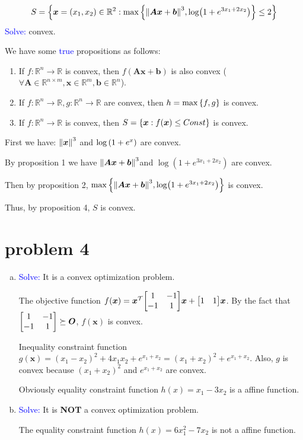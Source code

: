 \documentclass{article}
\def\RR{\mathbb{R}}
\def\bx{\boldsymbol{x}}
\def\bb{\boldsymbol{b}}
\def\bA{\boldsymbol{A}}
\def\bO{\boldsymbol{O}}
\def\Esolve{\textcolor{blue}{Solve: }}
\begin{document}
$$
S=\qty{
	\bx=(x_1,x_2)\in\RR^2:
	\max\qty{\norm{\bA\bx+\bb}^3,\log(1+e^{3x_1+2x_2})}\le2
}
$$
\Esolve convex.

We have some \textcolor{blue}{true} propositions as follows:
\begin{enumerate}[1.]
	\item If $f:\RR^n\to\RR$ is convex, then $f(\bA\bx+\bb)$ is also convex ($\forall\bA\in\RR^{n\times m},\bx\in\RR^m,\bb\in\RR^n$).
	\item If $f:\RR^n\to\RR,g:\RR^n\to\RR$ are convex, then $h=\max\qty{f,g}$ is convex.
	\item If $f:\RR^n\to\RR$ is convex, then $S=\qty{\bx:f(\bx)\le Const}$ is convex.
\end{enumerate}

First we have: $\norm{\bx}^3$ and 
$\log\qty(1+e^x)$ are convex.

By proposition 1 we have 
$\norm{\bA\bx+\bb}^3$and $\log(1+e^{3x_1+2x_2})$ are convex.

Then by proposition 2, $\max\qty{\norm{\bA\bx+\bb}^3,\log(1+e^{3x_1+2x_2})}$ is convex.

Thus, by proposition 4, $S$ is convex.
\section*{problem 4}

\begin{enumerate}[(a)]
	\item 
		\Esolve
		It is a convex optimization problem.

		The objective function 
		$f(\bx)= 
		\bx^\mathcal{T}
		\mqty[1 & -1 \\ -1 & 1]
		\bx+\mqty[1 & 1]\bx
		$.
		By the fact that $\mqty[1 & -1 \\ -1 & 1]\succeq \bO$, $f(\bx)$ is convex.

		Inequality constraint function $g(\bx) = (x_1-x_2)^2 + 4x_1x_2 + e^{x_1+x_2}=(x_1+x_2)^2+e^{x_1+x_2}$. Also, $g$ is convex because $(x_1+x_2)^2$ and $e^{x_1+x_2}$ are convex.

		Obviously equality constraint function $h(x)=x_1-3x_2$ is a affine function.
	\item
		\Esolve
		It is \textbf{NOT} a convex optimization problem.

		The equality constraint function $h(x)=6x_1^2-7x_2$ is not a affine function.
\end{enumerate}
\end{document}
